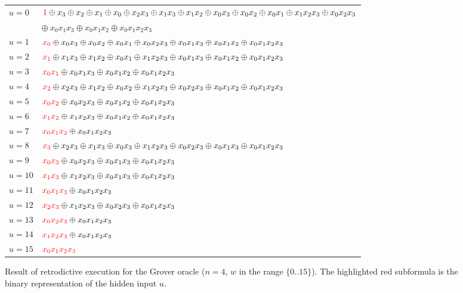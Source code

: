 \documentclass[sigplan,screen]{acmart}
\newcommand{\red}[1]{{\color{red}{#1}}}
\theoremstyle{definition}
\begin{document}
\begin{figure}
\begin{tabular}{ll}
$u=0$ &
  $\red{1} \oplus x_3 \oplus x_2 \oplus x_1 \oplus x_0 \oplus x_2x_3 \oplus x_1x_3 \oplus x_1x_2 \oplus x_0x_3 \oplus x_0x_2 \oplus x_0x_1 \oplus x_1x_2x_3 \oplus x_0x_2x_3$ \\
   &\quad $\oplus ~x_0x_1x_3 \oplus x_0x_1x_2 \oplus x_0x_1x_2x_3$ \\
$u=1$ &
  $\red{x_0} \oplus x_0x_3 \oplus x_0x_2 \oplus x_0x_1 \oplus x_0x_2x_3 \oplus x_0x_1x_3 \oplus x_0x_1x_2 \oplus x_0x_1x_2x_3$ \\
$u=2$ &
  $\red{x_1} \oplus x_1x_3 \oplus x_1x_2 \oplus x_0x_1 \oplus x_1x_2x_3 \oplus x_0x_1x_3 \oplus x_0x_1x_2 \oplus x_0x_1x_2x_3$ \\
$u=3$ &
  $\red{x_0x_1} \oplus x_0x_1x_3 \oplus x_0x_1x_2 \oplus x_0x_1x_2x_3$ \\
$u=4$ &
  $\red{x_2} \oplus x_2x_3 \oplus x_1x_2 \oplus x_0x_2 \oplus x_1x_2x_3 \oplus x_0x_2x_3 \oplus x_0x_1x_2 \oplus x_0x_1x_2x_3$ \\
$u=5$ &
  $\red{x_0x_2} \oplus x_0x_2x_3 \oplus x_0x_1x_2 \oplus x_0x_1x_2x_3$ \\
$u=6$ &
  $\red{x_1x_2} \oplus x_1x_2x_3 \oplus x_0x_1x_2 \oplus x_0x_1x_2x_3$ \\
$u=7$ &
  $\red{x_0x_1x_2} \oplus x_0x_1x_2x_3$ \\
$u=8$ &
  $\red{x_3} \oplus x_2x_3 \oplus x_1x_3 \oplus x_0x_3 \oplus x_1x_2x_3 \oplus x_0x_2x_3 \oplus x_0x_1x_3 \oplus x_0x_1x_2x_3$ \\
$u=9$ &
  $\red{x_0x_3} \oplus x_0x_2x_3 \oplus x_0x_1x_3 \oplus x_0x_1x_2x_3$ \\
$u=10$ &
  $\red{x_1x_3} \oplus x_1x_2x_3 \oplus x_0x_1x_3 \oplus x_0x_1x_2x_3$ \\
$u=11$ &
  $\red{x_0x_1x_3} \oplus x_0x_1x_2x_3$ \\
$u=12$ &
  $\red{x_2x_3} \oplus x_1x_2x_3 \oplus x_0x_2x_3 \oplus x_0x_1x_2x_3$ \\
$u=13$ &
  $\red{x_0x_2x_3} \oplus x_0x_1x_2x_3$ \\
$u=14$ &
  $\red{x_1x_2x_3} \oplus x_0x_1x_2x_3$ \\
$u=15$ &
  $\red{x_0x_1x_2x_3}$
\end{tabular}
\caption{\label{fig:Grover}Result of retrodictive execution for the Grover oracle ($n=4$, $w$ in the range $\{0..15\}$). The highlighted red subformula is the binary representation of the hidden input $u$.}
\end{figure}
\end{document}
